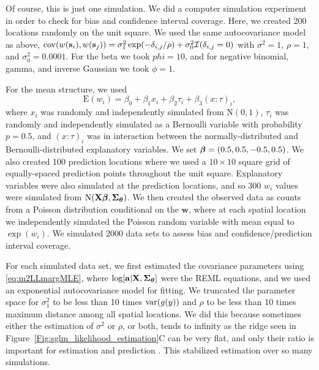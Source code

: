 \documentclass[12pt, titlepage]{article}
\begin{document}
Of course, this is just one simulation. We did a computer simulation experiment in order to check for bias and confidence interval coverage. Here, we created 200 locations randomly on the unit square. We used the same autocovariance model as above, $\textrm{cov}(w(\mathbf{s}_{i}),w(\mathbf{s}_{j})) = \sigma^{2}_{1}\exp(-\delta_{i,j}/\rho) + \sigma^{2}_{0}\mathcal{I}(\delta_{i,j} = 0)$ with $\sigma^{2} = 1$, $\rho = 1$, and $\sigma^{2}_{0} = 0.0001$.  For the beta we took $phi = 10$, and for negative binomial, gamma, and inverse Gaussian we took $\phi = 1$. 

For the mean structure, we used
$$
\textrm{E}(w_{i}) = \beta_{0} + \beta_{1}x_{i} + \beta_{2}\tau_{i} + \beta_{3}(x{:}\tau)_{i},
$$
where $x_{i}$ was randomly and independently simulated from $\textrm{N}(0,1)$, $\tau_{i}$ was randomly and independently simulated as a Bernoulli variable with probability $p = 0.5$, and $(x{:}\tau)_{i}$ was in interaction between the normally-distributed and Bernoulli-distributed explanatory variables.  We set $\boldsymbol{\beta} = (0.5, 0.5, -0.5, 0.5)$.  We also created 100 prediction locations where we used a $10 \times 10$ square grid of equally-spaced prediction points throughout the unit square.  Explanatory variables were also simulated at the prediction locations, and so 300 $w_{i}$ values were simulated from $\textrm{N}(\mathbf{X}\boldsymbol{\beta},\mbox{\boldmath $\Sigma$}_{\boldsymbol{\theta}})$. We then created the observed data as counts from a Poisson distribution conditional on the $\mathbf{w}$, where at each spatial location we independently simulated the Poisson random variable with mean equal to $\exp(w_{i})$.  We simulated 2000 data sets to assess bias and confidence/prediction interval coverage.

For each simulated data set, we first estimated the covariance parameters using \eqref{eq:m2LLmargMLE}, where $\textrm{log}[\mathbf{a}|\mathbf{X},\mbox{\boldmath $\Sigma$}_{\boldsymbol{\theta}}]$ were the REML equations, and we used an exponential autocovariance model for fitting. We truncated the parameter space for $\sigma^{2}_{1}$ to be less than 10 times $\textrm{var}(g(y))$ and $\rho$ to be less than 10 times maximum distance among all spatial locations.  We did this because sometimes either the estimation of $\sigma^{2}$ or $\rho$, or both, tends to infinity as the ridge seen in Figure~\ref{Fig:sglm_likelihood_estimation}C can be very flat, and only their ratio is important for estimation and prediction \citep{zhang_inconsistent_2004}. This stabilized estimation over so many simulations.
\end{document}
